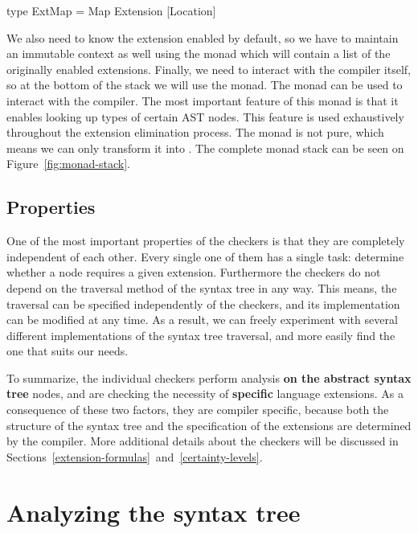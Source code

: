 \documentclass[main.tex]{subfiles}
\begin{document}
	\vspace{-0.2cm}
	\begin{oneLineHaskell}
		type ExtMap = Map Extension [Location]
	\end{oneLineHaskell}
	
	We also need to know the extension enabled by default, so we have to maintain an immutable context as well using the  monad which will contain a list of the originally enabled extensions. Finally, we need to interact with the compiler itself, so at the bottom of the stack we will use the  monad. The  monad can be used to interact with the compiler. The most important feature of this monad is that it enables looking up types of certain AST nodes. This feature is used exhaustively throughout the extension elimination process. The  monad is not pure, which means we can only transform it into . The complete monad stack can be seen on Figure~\ref{fig:monad-stack}.
	
	
	
	\subsection{Properties}
	
	One of the most important properties of the checkers is that they are completely independent of each other. Every single one of them has a single task: determine whether a node requires a given extension. Furthermore the checkers do not depend on the traversal method of the syntax tree in any way. This means, the traversal can be specified independently of the checkers, and its implementation can be modified at any time. As a result, we can freely experiment with several different implementations of the syntax tree traversal, and more easily find the one that suits our needs.
	
	To summarize, the individual checkers perform analysis \textbf{on the abstract syntax tree} nodes, and are checking the necessity of \textbf{specific} language extensions. As a consequence of these two factors, they are compiler specific, because both the structure of the syntax tree and the specification of the extensions are determined by the compiler. More additional details about the checkers will be discussed in Sections~\ref{extension-formulas}~and~\ref{certainty-levels}.
	
	\section{Analyzing the syntax tree}
	
\end{document}
